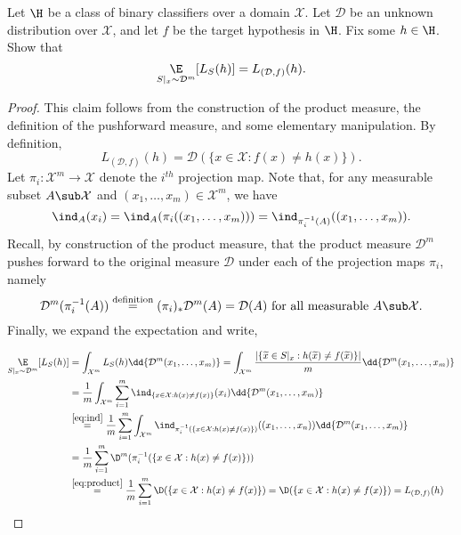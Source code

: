 \documentclass[12pt]{article}
\begin{document}
\begin{homeworkProblem}
  Let $ \H $ be a class of binary classifiers over a domain $ \mathcal{X} $. Let $ \mathcal{D} $ be an unknown distribution over $ \mathcal{X} $, and let $ f $ be the target hypothesis in $ \H $. Fix some $ h\in \H $. Show that 
  \[
    \underset{S\vert_{x} \sim \mathcal{D}^{m}}{\E}[L_{S}(h)] = L_{(\mathcal{D},f)}(h).
  \]
\end{homeworkProblem}

\begin{proof}
  This claim follows from the construction of the product measure, the definition of the pushforward measure, and some elementary manipulation. By definition,
  \[
    L_{(\mathcal{D},f)}(h) = \mathcal{D}(\{x\in \mathcal{X}: f(x)\neq h(x)\}).
  \]
  Let $ \pi_{i}:\mathcal{X}^{m}\to \mathcal{X} $ denote the $ i^{th} $ projection map. Note that, for any measurable subset $ A\sub \mathcal{X} $ and $ (x_{1},\ldots,x_{m})\in \mathcal{X}^{m}$, we have
  \begin{equation}\label{eq:ind}
    \ind_{A} (x_{i}) = \ind_{A} (\pi_{i}((x_{1},\ldots,x_{m})))  = \ind_{\pi_{i}^{-1}(A)}((x_{1},\ldots,x_{m})).
  \end{equation}
  Recall, by construction of the product measure, that the product measure $ \mathcal{D}^{m} $ pushes forward to the original measure $ \mathcal{D} $ under each of the projection maps $ \pi_{i} $, namely
  \begin{equation}\label{eq:product}
    \mathcal{D}^{m}(\pi_{i}^{-1}(A))\overset{\text{definition}}{=} (\pi_{i})_{*}\mathcal{D}^{m}(A) = \mathcal{D}(A) \text{ for all measurable }A\sub \mathcal{X}.
  \end{equation}
  Finally, we expand the expectation and write,
  
  \begin{align*}
    \underset{S\vert_{x} \sim \mathcal{D}^{m}}{\E}[L_{S}(h)] &= \int_{\mathcal{X}^{m}} L_{S}(h) \dd{\mathcal{D}^{m}(x_{1},\ldots, x_{m})}
    = \int_{\mathcal{X}^{m}} \frac{|\{\widetilde{x}\in S\vert_{x} : h(\widetilde{x}) \neq f(\widetilde{x})\}|}{m} \dd{\mathcal{D}^{m}(x_{1},\ldots, x_{m})}\\
    &=\frac{1}{m} \int_{\mathcal{X}^{m}} \sum_{i=1}^{m}\ind_{\{x\in \mathcal{X}: h(x) \neq f(x)\}}(x_{i}) \dd{\mathcal{D}^{m}(x_{1},\ldots, x_{m})}\\
    &\overset{\eqref{eq:ind}}{=}\frac{1}{m} \sum_{i=1}^{m}\int_{\mathcal{X}^{m}} \ind_{\pi_{i}^{-1}(\{x\in \mathcal{X}: h(x) \neq f(x)\})}((x_{1},\ldots,x_{n})) \dd{\mathcal{D}^{m}(x_{1},\ldots, x_{m})}\\
    &=\frac{1}{m} \sum_{i=1}^{m} \mathcal{\D}^{m}(\pi_{i}^{-1}(\{x\in \mathcal{X}: h(x) \neq f(x)\}) )\\
    &\overset{\eqref{eq:product}}{=}\frac{1}{m} \sum_{i=1}^{m} \mathcal{\D}(\{x\in \mathcal{X}: h(x) \neq f(x)\}) = \mathcal{\D}(\{x\in \mathcal{X}: h(x) \neq f(x)\}) = L_{(\mathcal{D},f)}(h)\\
  \end{align*}






\end{proof}
\end{document}
